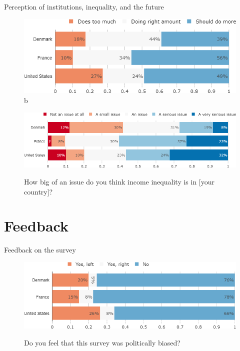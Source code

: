 \documentclass[aspectratio=169,9pt,dvipsnames]{beamer}
\begin{document}
\begin{frame}{Perception of institutions, inequality, and the future}%
\vspace{-.2cm}
\begin{figure}[h!]
\caption{Some people think the government is trying to do too many things that should be left to individuals and businesses. Others think that government should do more to solve our country's problems.
Which come closer to your own view? }
\includegraphics[width=.5\textwidth]{../figures/country_comparison/view_govt_countries.png} \\ b
\vspace{.1cm}
\caption{How big of an issue do you think income inequality is in [your country]?}
\includegraphics[width=.6\textwidth]{../figures/country_comparison/problem_inequality_countries.png}\\
\end{figure}
\end{frame}


\section{Feedback}
\begin{frame}{Feedback on the survey}%
\vspace{-.2cm}
\begin{figure}[h!]
\caption{Do you feel that this survey was politically biased?}
\includegraphics[width=.6\textwidth]{../figures/country_comparison/survey_biased_countries.png} \\
\end{figure}
\end{frame}
\end{document}
